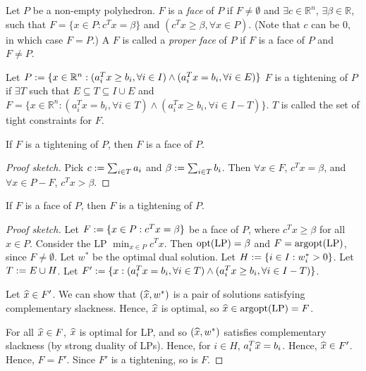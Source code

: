 \documentclass[a4paper, 12pt, fleqn]{article}
\newcommand*{\LP}{\mathrm{LP}}
\begin{document}
\begin{definition}[Face]
Let $P$ be a non-empty polyhedron. $F$ is a \emph{face} of $P$ if $F \neq \emptyset$
and $\exists c \in \mathbb{R}^n$, $\exists \beta \in \mathbb{R}$, such that
$F = \{x \in P: c^Tx = \beta\}$ and $(c^Tx \ge \beta, \forall x \in P)$.
(Note that $c$ can be 0, in which case $F = P$.)
A $F$ is called a \emph{proper face} of $P$ if $F$ is a face of $P$ and $F \neq P$.
\end{definition}

\begin{definition}[Tightening]
Let $P := \{x \in \mathbb{R}^n: (a_i^Tx \ge b_i, \forall i \in I) \wedge (a_i^Tx = b_i, \forall i \in E)\}$
$F$ is a tightening of $P$ if $\exists T$ such that $E \subseteq T \subseteq I \cup E$ and
$F = \{x \in \mathbb{R}^n: (a_i^Tx = b_i, \forall i \in T) \wedge (a_i^Tx \ge b_i, \forall i \in I-T)\}$.
$T$ is called the set of tight constraints for $F$.
\end{definition}

\begin{lemma}
\label{thm:tightening-is-face}
If $F$ is a tightening of $P$, then $F$ is a face of $P$.
\end{lemma}
\begin{proof}[Proof sketch]
Pick $c := \sum_{i \in T} a_i$ and $\beta := \sum_{i \in T} b_i$.
Then $\forall x \in F$, $c^Tx = \beta$, and $\forall x \in P - F$, $c^Tx > \beta$.
\end{proof}

\begin{theorem}
\label{thm:face-is-tightening}
If $F$ is a face of $P$, then $F$ is a tightening of $P$.
\end{theorem}
\begin{proof}[Proof sketch]
Let $F := \{x \in P: c^Tx = \beta\}$ be a face of $P$,
where $c^Tx \ge \beta$ for all $x \in P$.
Consider the LP $\min_{x \in P} c^Tx$.
Then $\opt(\LP) = \beta$ and $F = \argopt(\LP)$, since $F \neq \emptyset$.
Let $w^*$ be the optimal dual solution.
Let $H := \{i \in I: w_i^* > 0\}$. Let $T := E \cup H$.
Let $F' := \{x: (a_i^Tx = b_i, \forall i \in T) \wedge (a_i^Tx \ge b_i, \forall i \in I-T)\}$.

Let $\widehat{x} \in F'$. We can show that $(\widehat{x}, w^*)$ is a pair of solutions
satisfying complementary slackness. Hence, $\widehat{x}$ is optimal, so $\xhat \in \argopt(\LP) = F$.

For all $\widehat{x} \in F$, $\widehat{x}$ is optimal for LP,
and so $(\widehat{x}, w^*)$ satisfies complementary slackness (by strong duality of LPs).
Hence, for $i \in H$, $a_i^T\widehat{x} = b_i$. Hence, $\widehat{x} \in F'$.
Hence, $F = F'$. Since $F'$ is a tightening, so is $F$.
\end{proof}
\end{document}
